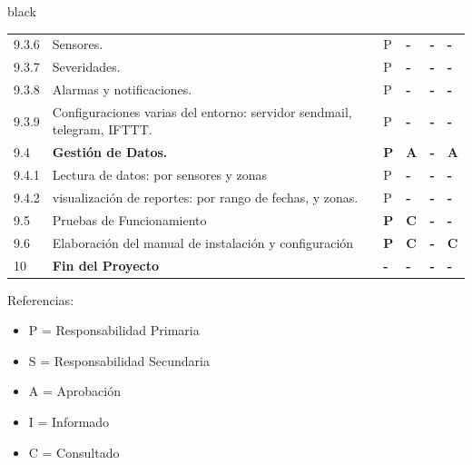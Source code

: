 \documentclass[11pt]{charter}
\begin{document}
\begin{consigna}{black}
\begin{tabularx}{\linewidth}{@{}|p{1.3cm}|p{10cm}|p{3cm}|p{3cm}|p{3cm}|p{3cm}|@{}}
9.3.6                  & Sensores.                                                                                     & P          & \textbf{-} & \textbf{-} & \textbf{-} \\
9.3.7                  & Severidades.                                                                                  & P          & \textbf{-} & \textbf{-} & \textbf{-} \\
9.3.8                  & Alarmas y notificaciones.                                                                     & P          & \textbf{-} & \textbf{-} & \textbf{-} \\
9.3.9                  & Configuraciones varias del   entorno: servidor sendmail, telegram, IFTTT.                     & P          & \textbf{-} & \textbf{-} & \textbf{-} \\
9.4                    & \textbf{Gestión de Datos.}                                                                    & \textbf{P} & \textbf{A} & \textbf{-} & \textbf{A} \\
9.4.1                  & Lectura de datos: por sensores y   zonas                                                      & P          & \textbf{-} & \textbf{-} & \textbf{-} \\
9.4.2                  & visualización de reportes: por   rango de fechas,  y zonas.                                   & P          & \textbf{-} & \textbf{-} & \textbf{-} \\
9.5                    & Pruebas de Funcionamiento                                                                     & \textbf{P} & \textbf{C} & \textbf{-} & \textbf{-} \\
9.6                    & Elaboración del manual de   instalación y configuración                                       & \textbf{P} & \textbf{C} & \textbf{-} & \textbf{C} \\
10                     & \textbf{Fin del Proyecto}                                                                     & \textbf{-} & \textbf{-} & \textbf{-} & \textbf{-}
\end{tabularx}

{\footnotesize
Referencias:
\begin{itemize}
	\item P = Responsabilidad Primaria
	\item S = Responsabilidad Secundaria
	\item A = Aprobación
	\item I = Informado
	\item C = Consultado
\end{itemize}
} %

%

\end{consigna}
\end{document}
